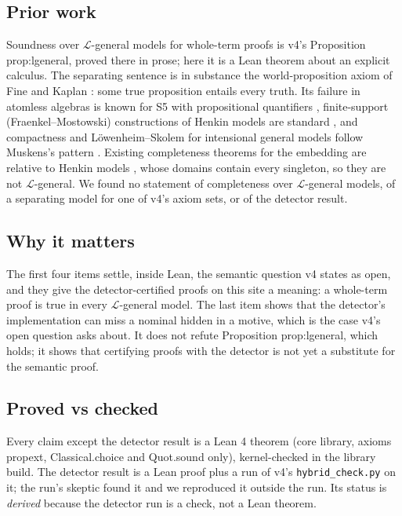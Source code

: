 \documentclass{article}
\begin{document}
\subsection*{Prior work}

Soundness over $\mathcal L$-general models for whole-term proofs is v4's Proposition
prop:lgeneral, proved there in prose; here it is a Lean theorem about an explicit calculus. The
separating sentence is in substance the world-proposition axiom of Fine and Kaplan
\cite{fine1970propositional}: some true proposition entails every truth. Its failure in atomless
algebras is known for S5 with propositional quantifiers \cite{holliday2019note}, finite-support
(Fraenkel--Mostowski) constructions of Henkin models are standard \cite{gabbay2011nominal}, and
compactness and Löwenheim--Skolem for intensional general models follow Muskens's pattern
\cite{muskens2007intensional}. Existing completeness theorems for the embedding are relative to
Henkin models \cite{benzmueller2013quantified}, whose domains contain every singleton, so they are
not $\mathcal L$-general. We found no statement of completeness over $\mathcal L$-general
models, of a separating model for one of v4's axiom sets, or of the detector result.

\subsection*{Why it matters}

The first four items settle, inside Lean, the semantic question v4 states as open, and they
give the detector-certified proofs on this site a meaning: a whole-term proof is true in every
$\mathcal L$-general model. The last item shows that the detector's implementation can miss a
nominal hidden in a motive, which is the case v4's open question asks about. It does not refute
Proposition prop:lgeneral, which holds; it shows that certifying proofs with the detector is
not yet a substitute for the semantic proof.

\subsection*{Proved vs checked}

Every claim except the detector result is a Lean 4 theorem (core library, axioms propext,
Classical.choice and Quot.sound only), kernel-checked in the library build. The detector result
is a Lean proof plus a run of v4's \texttt{hybrid\_check.py} on it; the run's skeptic found it and we
reproduced it outside the run. Its status is \emph{derived} because the detector run is a check, not
a Lean theorem.
\end{document}
